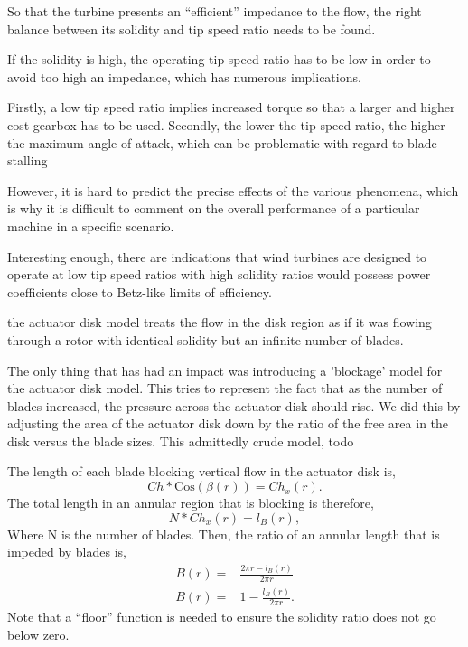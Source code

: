 So that the turbine presents an ``efficient'' impedance to the flow, the 
right balance between its solidity and tip speed ratio needs to be found.

If the solidity is high, the operating tip speed ratio has to be low in
order to avoid too high an impedance, which has numerous implications. 

Firstly, a low tip speed ratio implies increased torque so that a larger
and higher cost gearbox has to be used. Secondly, the lower the tip
speed ratio, the higher the maximum angle of attack, which can be
problematic with regard to blade stalling

However, it is hard to predict the precise effects of the various
phenomena, which is why it is difficult to comment on the overall
performance of a particular machine in a specific
scenario. 

Interesting enough, there are indications that wind turbines are
designed to operate at low tip speed ratios with high solidity ratios
would possess power coefficients close to Betz-like limits of
efficiency\cite{WE:WE118}. 


the actuator disk model treats the flow in the disk region as if it was
flowing through a rotor with identical solidity but an infinite number
of blades. 

The only thing that has had an impact was introducing a 'blockage' model
for the actuator disk model. This tries to represent the fact that as
the number of blades increased, the pressure across the actuator disk
should rise. We did this by adjusting the area of the actuator disk down
by the ratio of the free area in the disk versus the blade sizes. 
This admittedly crude model, todo

The length of each blade blocking vertical flow in the actuator disk is, 
\begin{equation}
  Ch * \text{Cos}(\beta(r)) = Ch_x(r). 
\end{equation}
The total length in an annular region that is blocking is therefore,
\begin{equation}
  N * Ch_x(r) = l_B(r),
\end{equation}
Where N is the number of blades. 
Then, the ratio of an annular length that is impeded by blades is, 
\begin{eqnarray}
 B(r) =& \frac{2\pi r- l_B(r)}{2 \pi r}\\
 B(r) =& 1- \frac{l_B(r)}{2 \pi r}. 
\end{eqnarray}
Note that a ``floor'' function is needed to ensure the solidity ratio
does not go below zero. 

